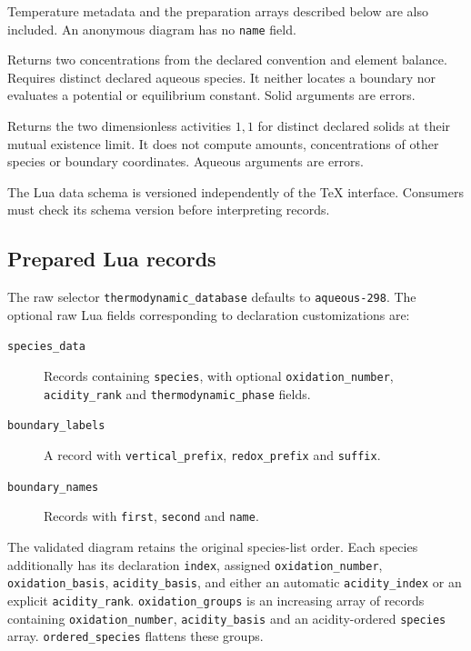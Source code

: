 \documentclass[a4paper,11pt]{ltxdoc}
\begin{document}
\begin{description}
    Temperature metadata and the preparation arrays described below are also
    included. An anonymous diagram has no \texttt{name} field.
  \item[\texttt{core.aqueous\_boundary\_concentrations(diagram, A, B)}]
    Returns two concentrations from the declared convention and element balance.
    Requires distinct declared aqueous species. It neither locates a boundary
    nor evaluates a potential or equilibrium constant. Solid arguments are errors.
  \item[\texttt{core.solid\_boundary\_activities(diagram, A, B)}]
    Returns the two dimensionless activities $1,1$ for distinct declared solids
    at their mutual existence limit. It does not compute amounts, concentrations
    of other species or boundary coordinates. Aqueous arguments are errors.
\end{description}
The Lua data schema is versioned independently of the TeX interface. Consumers
must check its schema version before interpreting records.

\subsection{Prepared Lua records}
The raw selector \texttt{thermodynamic\_database} defaults to
\texttt{aqueous-298}. The optional raw Lua fields corresponding to declaration
customizations are:
\begin{description}
  \item[\texttt{species\_data}] Records containing \texttt{species}, with optional
    \texttt{oxidation\_number}, \texttt{acidity\_rank} and
    \texttt{thermodynamic\_phase} fields.
  \item[\texttt{boundary\_labels}] A record with \texttt{vertical\_prefix},
    \texttt{redox\_prefix} and \texttt{suffix}.
  \item[\texttt{boundary\_names}] Records with \texttt{first}, \texttt{second}
    and \texttt{name}.
\end{description}

The validated diagram retains the original species-list order. Each species
additionally has its declaration \texttt{index}, assigned \texttt{oxidation\_number},
\texttt{oxidation\_basis}, \texttt{acidity\_basis}, and either an automatic
\texttt{acidity\_index} or an explicit \texttt{acidity\_rank}.
\texttt{oxidation\_groups} is an increasing array of records containing
\texttt{oxidation\_number}, \texttt{acidity\_basis} and an acidity-ordered
\texttt{species} array. \texttt{ordered\_species} flattens these groups.
\end{document}
